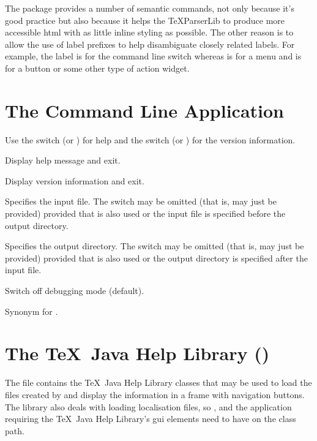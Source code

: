 \documentclass[toc=listof]{scrreport}
\begin{document}
The  package provides a number of semantic commands, not only
because it's good practice but also because it helps the \gls{TeXParserLib} to
produce more accessible \gls{html} with as little inline styling as possible.
The other reason is to allow the use of label prefixes to help disambiguate
closely related labels.  For example, the label  is for the
command line switch  whereas  is for a 
menu and  is for a  button or some other type of
action widget.

\chapter{The  Command Line Application}
\label{sec:texjavahelpmk}


Use the  switch 
(or ) for help and the
 switch
(or ) for the version information.

Display help message and exit.

Display version information and exit.

Specifies the input file. The switch may be omitted (that is,
 may just be provided) provided that
 is also used or the input file is specified before
the output directory.

Specifies the output directory. The switch may be omitted
(that is,  may just be provided) provided that
 is also used or the output directory is specified after
the input file.

Switch off debugging mode (default).

Synonym for .

\chapter{The \TeX\ Java Help Library ()}
\label{sec:texjavahelplib}

The  file contains the 
\TeX\ Java Help Library classes that may be used to load the
files created by  and display the information in
a frame with navigation buttons. The library also deals with loading
localisation files, so ,  and the
application requiring the \TeX\ Java Help Library's \gls{gui}
elements need to have  on the class path.
\end{document}
